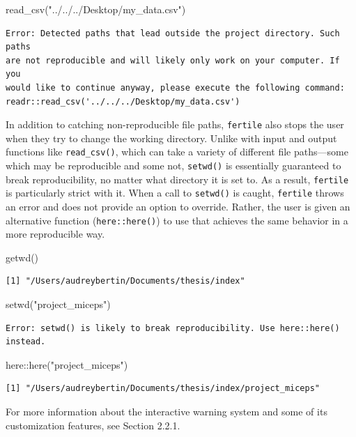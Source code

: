 \documentclass[12pt,twoside]{reedthesis}
\newenvironment{Shaded}{\begin{snugshade}}{\end{snugshade}}
\newcommand{\FunctionTok}[1]{\textcolor[rgb]{0.00,0.00,0.00}{#1}}
\newcommand{\NormalTok}[1]{#1}
\newcommand{\SpecialCharTok}[1]{\textcolor[rgb]{0.00,0.00,0.00}{#1}}
\newcommand{\StringTok}[1]{\textcolor[rgb]{0.31,0.60,0.02}{#1}}
\begin{document}
\begin{Shaded}
\begin{Highlighting}[]
\FunctionTok{read\_csv}\NormalTok{(}\StringTok{"../../../Desktop/my\_data.csv"}\NormalTok{)}
\end{Highlighting}
\end{Shaded}
\begin{verbatim}
Error: Detected paths that lead outside the project directory. Such paths
are not reproducible and will likely only work on your computer. If you
would like to continue anyway, please execute the following command:
readr::read_csv('../../../Desktop/my_data.csv')
\end{verbatim}
In addition to catching non-reproducible file paths, \texttt{fertile} also stops the user when they try to change the working directory. Unlike with input and output functions like \texttt{read\_csv()}, which can take a variety of different file paths---some which may be reproducible and some not, \texttt{setwd()} is essentially guaranteed to break reproducibility, no matter what directory it is set to. As a result, \texttt{fertile} is particularly strict with it. When a call to \texttt{setwd()} is caught, \texttt{fertile} throws an error and does not provide an option to override. Rather, the user is given an alternative function (\texttt{here::here()}) to use that achieves the same behavior in a more reproducible way.
\begin{Shaded}
\begin{Highlighting}[]
\FunctionTok{getwd}\NormalTok{()}
\end{Highlighting}
\end{Shaded}
\begin{verbatim}
[1] "/Users/audreybertin/Documents/thesis/index"
\end{verbatim}
\begin{Shaded}
\begin{Highlighting}[]
\FunctionTok{setwd}\NormalTok{(}\StringTok{"project\_miceps"}\NormalTok{)}
\end{Highlighting}
\end{Shaded}
\begin{verbatim}
Error: setwd() is likely to break reproducibility. Use here::here() instead.
\end{verbatim}
\begin{Shaded}
\begin{Highlighting}[]
\NormalTok{here}\SpecialCharTok{::}\FunctionTok{here}\NormalTok{(}\StringTok{"project\_miceps"}\NormalTok{)}
\end{Highlighting}
\end{Shaded}
\begin{verbatim}
[1] "/Users/audreybertin/Documents/thesis/index/project_miceps"
\end{verbatim}
For more information about the interactive warning system and some of its customization features, see Section 2.2.1.
\end{document}
